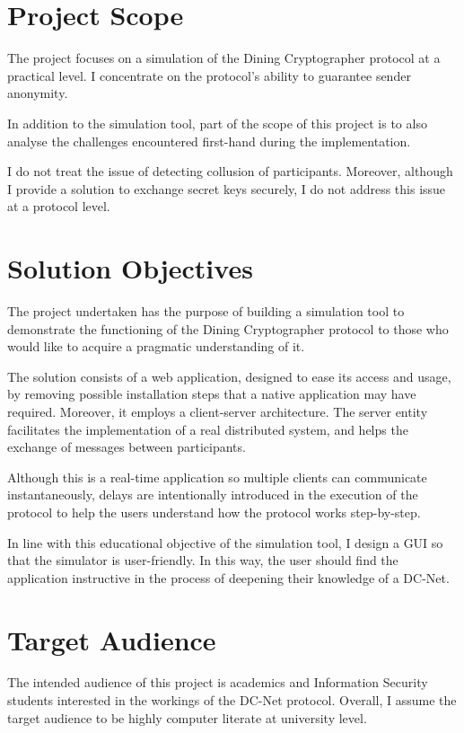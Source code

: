 \section{Project Scope}
The project focuses on a simulation of the Dining Cryptographer protocol at a practical level. I concentrate on the protocol's ability to guarantee sender anonymity. 

In addition to the simulation tool, part of the scope of this project is to also analyse the challenges encountered first-hand during the implementation. 

I do not treat the issue of detecting collusion of participants.  Moreover, although I provide a solution to exchange secret keys securely, I do not address this issue at a protocol level.


\section{Solution Objectives}
The project undertaken has the purpose of building a simulation tool to demonstrate the functioning of the Dining Cryptographer protocol to those who would like to acquire a pragmatic understanding of it.

The solution consists of a web application, designed to ease its access and usage, by removing possible installation steps that a native application may have required. Moreover, it employs a client-server architecture. The server entity facilitates the implementation of a real distributed system, and helps the exchange of messages between participants.

Although this is a real-time application so multiple clients can communicate instantaneously, delays are intentionally introduced in the execution of the protocol to help the users understand how the protocol works step-by-step. 

In line with this educational objective of the simulation tool, I design a GUI so that the simulator is user-friendly. In this way, the user should find the application instructive in the process of deepening their knowledge of a DC-Net.


\section{Target Audience}
The intended audience of this project is academics and Information Security students interested in the workings of the DC-Net protocol. Overall, I assume the target audience to be highly computer literate at university level.


